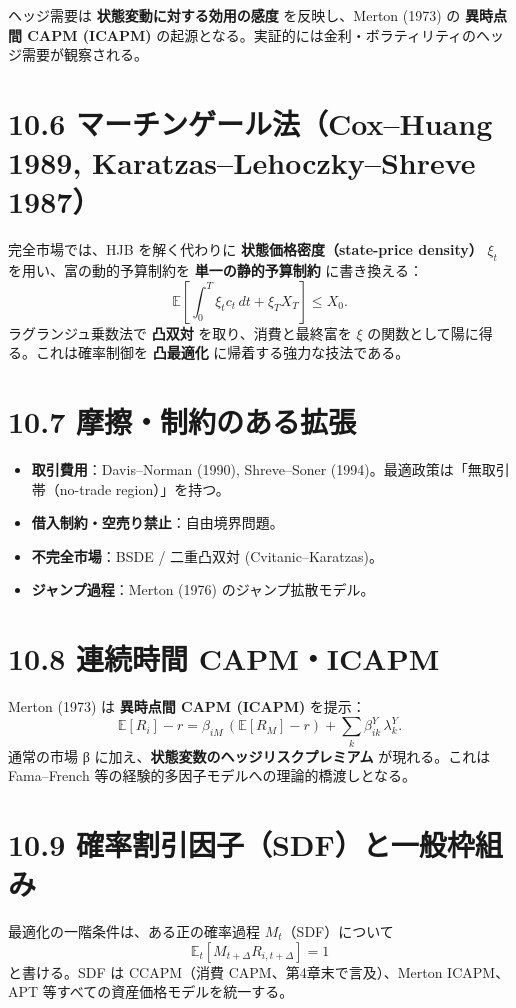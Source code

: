 \documentclass[11pt,a4paper]{report}
\begin{document}
ヘッジ需要は \textbf{状態変動に対する効用の感度} を反映し、Merton (1973) の \textbf{異時点間 CAPM (ICAPM)} の起源となる。実証的には金利・ボラティリティのヘッジ需要が観察される。

\section{10.6 マーチンゲール法（Cox–Huang 1989, Karatzas–Lehoczky–Shreve 1987）}

完全市場では、HJB を解く代わりに \textbf{状態価格密度（state-price density）} $\xi_t$ を用い、富の動的予算制約を \textbf{単一の静的予算制約} に書き換える： \[ \mathbb{E}\left[\int_0^T \xi_t c_t \, dt + \xi_T X_T\right] \le X_0. \] ラグランジュ乗数法で \textbf{凸双対} を取り、消費と最終富を $\xi$ の関数として陽に得る。これは確率制御を \textbf{凸最適化} に帰着する強力な技法である。

\section{10.7 摩擦・制約のある拡張}

\begin{itemize}
\item \textbf{取引費用}：Davis–Norman (1990), Shreve–Soner (1994)。最適政策は「無取引帯（no-trade region）」を持つ。
\item \textbf{借入制約・空売り禁止}：自由境界問題。
\item \textbf{不完全市場}：BSDE / 二重凸双対 (Cvitanic–Karatzas)。
\item \textbf{ジャンプ過程}：Merton (1976) のジャンプ拡散モデル。
\end{itemize}

\section{10.8 連続時間 CAPM・ICAPM}

Merton (1973) は \textbf{異時点間 CAPM (ICAPM)} を提示： \[ \mathbb{E}[R_i] - r = \beta_{iM}\, (\mathbb{E}[R_M] - r) + \sum_k \beta_{ik}^Y\, \lambda_k^Y. \] 通常の市場 β に加え、\textbf{状態変数のヘッジリスクプレミアム} が現れる。これは Fama–French 等の経験的多因子モデルへの理論的橋渡しとなる。

\section{10.9 確率割引因子（SDF）と一般枠組み}

最適化の一階条件は、ある正の確率過程 $M_t$（SDF）について \[ \mathbb{E}_t[M_{t+\Delta} R_{i,t+\Delta}] = 1 \] と書ける。SDF は CCAPM（消費 CAPM、第4章末で言及）、Merton ICAPM、APT 等すべての資産価格モデルを統一する。
\end{document}
